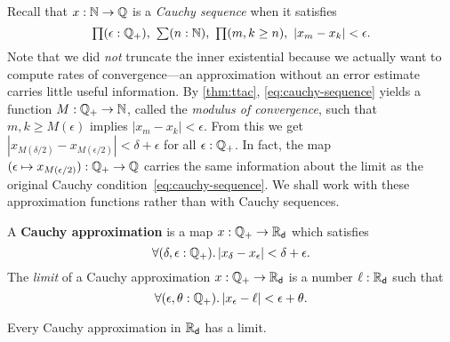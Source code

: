 Recall that $x : \mathbb{N} \to \mathbb{Q}$ is a \emph{Cauchy sequence} when it satisfies
%
\begin{equation} \label{eq:cauchy-sequence}
  \prd{\epsilon : \Qp} \sm{n : \N} \prd{m, k \geq n} |x_m - x_k| < \epsilon.
\end{equation}
%
Note that we did \emph{not} truncate the inner existential because we actually want to
compute rates of convergence---an approximation without an error estimate carries little
useful information. By \autoref{thm:ttac}, \eqref{eq:cauchy-sequence} yields a function $M
: \mathbb{Q}_{+} \to \mathbb{N}$, called the \emph{modulus of convergence}, such that $m, k \geq M(\epsilon)$
implies $|x_m - x_k| < \epsilon$. From this we get $|x_{M(\delta/2)} - x_{M(\epsilon/2)}|<
\delta + \epsilon$ for all $\epsilon : \mathbb{Q}_{+}$. In fact, the map $(\epsilon \mapsto
x_{M(\epsilon/2)}) : \mathbb{Q}_{+} \to \mathbb{Q}$ carries the same information about the limit as the
original Cauchy condition~\eqref{eq:cauchy-sequence}. We shall work with these
approximation functions rather than with Cauchy sequences.

\begin{defn} \label{defn:cauchy-approximation}
  A \textbf{Cauchy approximation} is a map $x : \mathbb{Q}_{+} \to \mathbb{R}_\mathsf{d}$ which satisfies
  \begin{equation}
    \label{eq:cauchy-approx}
    \fall{\delta, \epsilon :\Qp} |x_\delta - x_\epsilon| < \delta + \epsilon.
  \end{equation}
  The \emph{limit} of a Cauchy approximation $x : \mathbb{Q}_{+} \to \mathbb{R}_\mathsf{d}$ is a number $\ell : \mathbb{R}_\mathsf{d}$ such
  that
  \begin{equation*}
    \fall{\epsilon, \theta : \Qp} |x_\epsilon - \ell| < \epsilon + \theta.
  \end{equation*}
\end{defn}

\begin{thm} \label{RD-cauchy-complete}
  Every Cauchy approximation in $\mathbb{R}_\mathsf{d}$ has a limit.
\end{thm}

